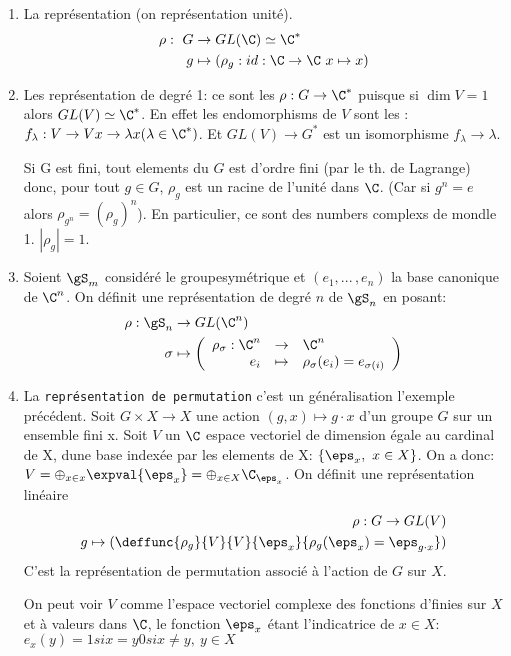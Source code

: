 \begin{examplebox}
	\begin{enumerate}
	\leavevmode
		\item La représentation  (on représentation unité).
		\begin{align*}
			\rho:\ G &\rightarrow GL(\C)\simeq\C^\ast\\
			g &\mapsto (\rho_g: id:\C\rightarrow \C\ x\mapsto x)
		\end{align*}
		\item Les représentation de degré 1: ce sont les  $\rho:G\rightarrow \C^\ast$ puisque si $\dim V= 1$ alors $GL(V)\simeq\C^\ast$.
		En effet les endomorphisms de $V$ sont les : $f_\lambda: V\rightarrow V x\rightarrow \lambda x(\lambda\in \C^\ast)$. Et $GL(V)\rightarrow  G^\ast$ est un isomorphisme $f_\lambda\rightarrow \lambda$.
		
		Si G est fini, tout elements du $G$ est d'ordre fini (par le th. de Lagrange) donc, pour tout $g \in G$, $\rho_g$ est un racine de l'unité dans $\C$.
		(Car si $g^n=e$ alors $\rho_{g^n}=(\rho_g)^n$). En particulier, ce sont des numbers complexs de mondle 1. $|\rho_g|=1$.
		\item Soient $\gS_m$ considéré le groupesymétrique et $(e_1,...\,, e_n)$ la base canonique de $\C^n$. On définit une représentation de degré $n$ de $\gS_n$ en posant:
		\begin{align*}
			\rho:\gS_n &\rightarrow GL(\C^n) \\
			\sigma &\mapsto \left(
				\begin{array}{rcl} \rho_\sigma: \C^n &\rightarrow&  \C^n \\ e_i &\mapsto& \rho_\sigma(e_i)=e_{\sigma(i)} \end{array}
			\right)
		\end{align*}
		\item La \texttt{représentation de permutation} c'est un généralisation l'exemple précédent. Soit $G\times X\rightarrow X$ une action $(g,x)\mapsto g\cdot x$ d'un groupe $G$ sur un ensemble fini x. Soit $V$ un $\C$ espace vectoriel de dimension égale au cardinal de X, dune base indexée par les elements de X: $\{\eps_x,\ x\in X\}$. On a donc: $V=\oplus_{x\in x}\expval{\eps_x}=\oplus_{x\in X}\C_{\eps_x}$. On définit une représentation linéaire
		\begin{align*}
		\rho: G\rightarrow  GL(V)\\
		g\mapsto(\deffunc{\rho_g}{V}{V}{\eps_x}{\rho_g(\eps_x)=\eps_{g\cdot x}})
		\end{align*}
		C'est la représentation de permutation associé à l'action de $G$ sur $X$.
		\begin{remark}
			On peut voir $V$ comme l'espace vectoriel complexe des fonctions d'finies sur $X$ et à valeurs dans $\C$, le fonction $\eps_x$ étant l'indicatrice de $x\in X$: $e_x(y)=1 si x=y 0 si x\neq y,\ y\in X$
		\end{remark}
		

\end{enumerate}
\end{examplebox}
